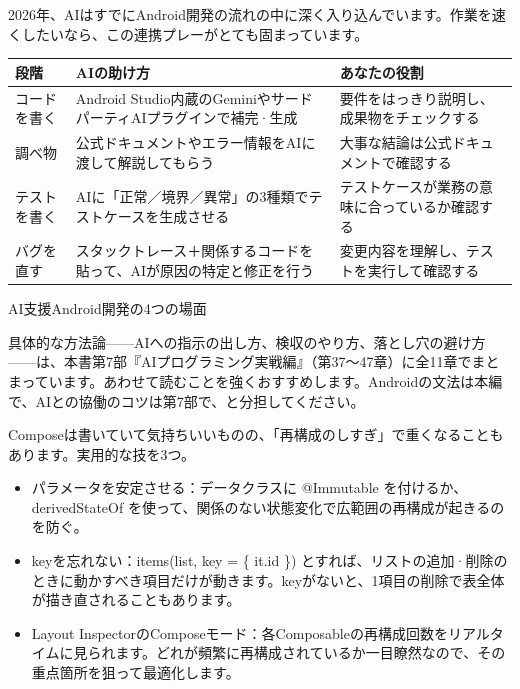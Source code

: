 
2026年、AIはすでにAndroid開発の流れの中に深く入り込んでいます。作業を速くしたいなら、この連携プレーがとても固まっています。

\begin{center}
\begin{tabularx}{\linewidth}{|X|X|X|}
\hline
\textbf{段階} & \textbf{AIの助け方} & \textbf{あなたの役割} \tabularnewline
\hline
コードを書く & Android Studio内蔵のGeminiやサードパーティAIプラグインで補完·生成 & 要件をはっきり説明し、成果物をチェックする \tabularnewline
調べ物 & 公式ドキュメントやエラー情報をAIに渡して解説してもらう & 大事な結論は公式ドキュメントで確認する \tabularnewline
テストを書く & AIに「正常／境界／異常」の3種類でテストケースを生成させる & テストケースが業務の意味に合っているか確認する \tabularnewline
バグを直す & スタックトレース＋関係するコードを貼って、AIが原因の特定と修正を行う & 変更内容を理解し、テストを実行して確認する \tabularnewline
\hline
\end{tabularx}
\end{center}

\begin{center}\small\color{gray}AI支援Android開発の4つの場面\end{center}

具体的な方法論——AIへの指示の出し方、検収のやり方、落とし穴の避け方——は、本書第7部『AIプログラミング実戦編』（第37〜47章）に全11章でまとまっています。あわせて読むことを強くおすすめします。Androidの文法は本編で、AIとの協働のコツは第7部で、と分担してください。


Composeは書いていて気持ちいいものの、「再構成のしすぎ」で重くなることもあります。実用的な技を3つ。

\begin{itemize}
  \item パラメータを安定させる：データクラスに @Immutable を付けるか、derivedStateOf を使って、関係のない状態変化で広範囲の再構成が起きるのを防ぐ。
  \item keyを忘れない：items(list, key = \{ it.id \}) とすれば、リストの追加·削除のときに動かすべき項目だけが動きます。keyがないと、1項目の削除で表全体が描き直されることもあります。
  \item Layout InspectorのComposeモード：各Composableの再構成回数をリアルタイムに見られます。どれが頻繁に再構成されているか一目瞭然なので、その重点箇所を狙って最適化します。
\end{itemize}

